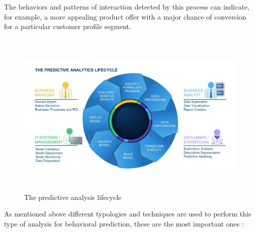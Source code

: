 The behaviors and patterns of interaction detected by this process can indicate, for example, a more appealing product offer with a major chance of conversion for a particular customer profile segment.

\vspace{0.5cm}
\begin{figure}[htbp]
  \centering
    \includegraphics[height=8cm]{images/pa-lifecycle.jpg}
  \caption{The predictive analysis lifecycle }
  \label{fig:bigdata}
\end{figure}
\vspace{0.5cm}

As mentioned above different typologies and techniques are used to perform this type of analysis for behavioral prediction, these are the most important ones :



